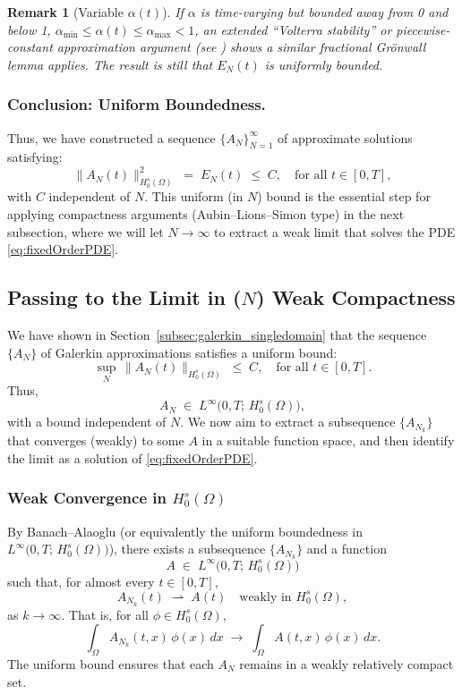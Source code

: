 \documentclass[12pt]{article}
\newtheorem{remark}[theorem]{Remark}
\begin{document}
\begin{remark}[Variable \(\alpha(t)\)]
If \(\alpha\) is time-varying but bounded away from 0 and below 1,
\(\alpha_{\min}\le \alpha(t)\le\alpha_{\max}<1\), an extended “Volterra stability” or
piecewise-constant approximation argument (see \cite{Sun2019,Ye2007}) shows a similar
fractional Grönwall lemma applies. The result is still that \(E_N(t)\) is uniformly
bounded.  
\end{remark}

\subsubsection{Conclusion: Uniform Boundedness.}
Thus, we have constructed a sequence \(\{A_N\}_{N=1}^\infty\) of approximate solutions
satisfying:
\[
\bigl\|A_N(t)\bigr\|_{H_0^s(\Omega)}^2
\;=\;
E_N(t)
\;\le\;
C,
\quad
\text{for all } t\in [0,T],
\]
with \(C\) independent of \(N\).  This uniform (in \(N\)) bound is the essential step
for applying compactness arguments (Aubin--Lions--Simon type) in the next subsection,
where we will let \(N\to\infty\) to extract a weak limit that solves the PDE
\eqref{eq:fixedOrderPDE}.
\subsection{Passing to the Limit in \texorpdfstring{(\(N\))}: Weak Compactness}
\label{subsec:limit_singledomain}

We have shown in Section~\ref{subsec:galerkin_singledomain} that the sequence
\(\{A_N\}\) of Galerkin approximations satisfies a uniform bound:
\[
\sup_{N}\,
\bigl\|A_N(t)\bigr\|_{H_0^s(\Omega)}
\;\le\;
C,
\quad
\text{for all } t\in[0,T].
\]
Thus, 
\[
A_N \;\in\; L^\infty\!\bigl(0,T;\,H_0^s(\Omega)\bigr),
\]
with a bound independent of \(N\). We now aim to extract a subsequence
\(\{A_{N_k}\}\) that converges (weakly) to some \(A\) in a suitable function space,
and then identify the limit as a solution of \eqref{eq:fixedOrderPDE}.

\subsubsection{Weak Convergence in \texorpdfstring{$H_0^s(\Omega)$}{H0s(Omega)}}
\label{sec:partA_weak_form}
By Banach–Alaoglu (or equivalently the uniform boundedness in \(L^\infty\bigl(0,T;\,H_0^s(\Omega)\bigr)\)),
there exists a subsequence \(\{A_{N_k}\}\) and a function
\[
A \;\in\; L^\infty\bigl(0,T;\,H_0^s(\Omega)\bigr)
\]
such that, for almost every \(t\in[0,T]\),
\[
A_{N_k}(t)\;\rightharpoonup\; A(t)
\quad
\text{weakly in }H_0^s(\Omega),
\]
as \(k\to\infty\). That is, for all \(\phi\in H_0^s(\Omega)\),
\[
\int_\Omega
  A_{N_k}(t,x)\,\phi(x)\,dx
\;\to\;
\int_\Omega
  A(t,x)\,\phi(x)\,dx.
\]
The uniform bound ensures that each \(A_N\) remains in a weakly relatively compact set.
\end{document}
